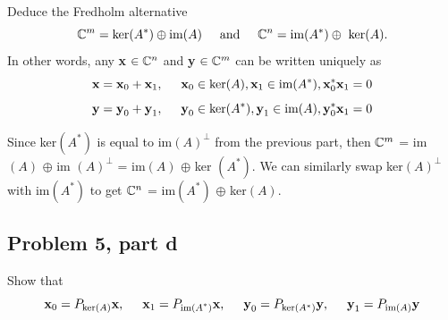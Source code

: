 Deduce the Fredholm alternative
\[ 
\mathbb{C}^m = \text{ker}(A^*) \oplus \text{im}(A) \hspace{5mm} \text{and} \hspace{5mm} \mathbb{C}^n = \text{im}(A^*) \oplus \text{ ker}(A).
\]
In other words, any \textbf{x} $\in \mathbb{C}^n$ and \textbf{y} $\in \mathbb{C}^m$ can be written uniquely as 
\[
\textbf{x} = \textbf{x}_0 + \textbf{x}_1, \hspace{5mm} \textbf{x}_0 \in \ker (A), \textbf{x}_1 \in \text{im} (A^*), \textbf{x}_0^*\textbf{x}_1 = 0
\]
 \[
\textbf{y} = \textbf{y}_0 + \textbf{y}_1, \hspace{5mm} \textbf{y}_0 \in \ker (A^*), \textbf{y}_1 \in \text{im} (A), \textbf{y}_0^*\textbf{x}_1 = 0
\]
\partbreak
\begin{solution}
    
Since ker$(A^*)$ is equal to im$(A)^\perp$ from the previous part, then $\mathbb{C}^m$ = im$(A)$ $\oplus$ im $(A)^\perp$ = im$(A)$ $\oplus$ ker $(A^*)$. We can similarly swap ker$(A)^\perp$ with im$(A^*)$ to get $\mathbb{C}^n$ = im$(A^*)$ $\oplus$ ker$(A)$.

\end{solution}

\newpage
\subsection{Problem 5, part d}

Show that 
\[
\textbf{x}_0 = P_{\ker(A)}\textbf{x}, \hspace{5mm} \textbf{x}_1 = P_{\text{im$(A^*)$}}\textbf{x}, \hspace{5mm} \textbf{y}_0 = P_{\ker (A^*)}\textbf{y}, \hspace{5mm} \textbf{y}_1 = P_{\text{im}(A)}\textbf{y}
\]

\partbreak


